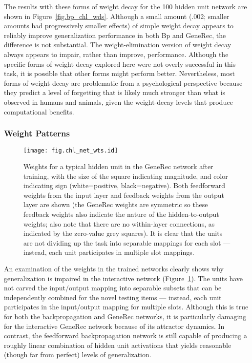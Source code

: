 \documentclass[12pt,twoside]{article}
\begin{document}
The results with these forms of weight decay for the 100 hidden unit
network are shown in Figure~\ref{fig.bp_chl_wds}.  Although a small
amount (.002; smaller amounts had progressively smaller effects) of
simple weight decay appears to reliably improve generalization
performance in both Bp and GeneRec, the difference is not substantial.
The weight-elimination version of weight decay always appears to
impair, rather than improve, performance.  Although the specific forms
of weight decay explored here were not overly successful in this task,
it is possible that other forms might perform better.  Nevertheless,
most forms of weight decay are problematic from a psychological
perspective because they predict a level of forgetting that is likely
much stronger than what is observed in humans and animals, given the
weight-decay levels that produce computational benefits.

\subsubsection{Weight Patterns}

\begin{figure}
  \centering\texttt{[image: fig.chl\_net\_wts.id]}
  \caption{\small Weights for a typical hidden unit in the GeneRec
    network after training, with the size of the square indicating
    magnitude, and color indicating sign (white=positive,
    black=negative).  Both feedforward weights from the input layer
    and feedback weights from the output layer are shown (the GeneRec
    weights are symmetric so these feedback weights also indicate the
    nature of the hidden-to-output weights; also note that there are
    no within-layer connections, as indicated by the zero-value grey
    squares).  It is clear that the units are not dividing up the task
    into separable mappings for each slot --- instead, each unit
    participates in multiple slot mappings.}
  \label{fig.chl_net_wts}
\end{figure}

An examination of the weights in the trained networks clearly shows
why generalization is impaired in the interactive network
(Figure~\ref{fig.chl_net_wts}).  The units have not carved the
input/output mapping into separable subsets that can be independently
combined for the novel testing items --- instead, each unit
participates in the input/output mapping for multiple slots.  Although
this is true for both the backpropagation and GeneRec networks, it is
particularly damaging for the interactive GeneRec network because of
its attractor dynamics.  In contrast, the feedforward backpropagation
network is still capable of producing a roughly linear combination of
hidden unit activations that yields reasonable (though far from
perfect) levels of generalization.
\end{document}
